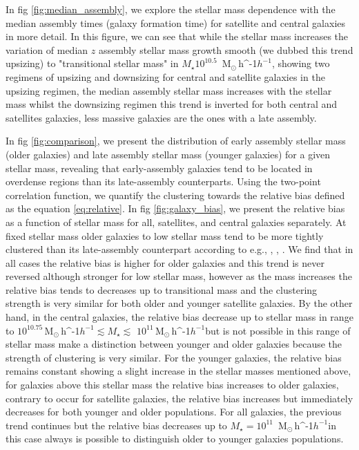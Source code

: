 \documentclass[a4paper,fleqn,usenatbib]{mnras}
\newcommand{\Msunh}{\,{\rm M}$_{\odot}$\,\ifmmode h^{-1}\else $h^{-1}$\fi}
\begin{document}
In fig \ref{fig:median_assembly}, we explore the stellar mass dependence with the median assembly times (galaxy formation time) for satellite and central galaxies in more detail. In this figure, we can see that while the stellar mass increases the variation of median $z$ assembly stellar mass growth smooth (we dubbed this trend upsizing) to "transitional stellar mass" in $M_\star 10^{10.5}$ \Msunh, showing two regimens of upsizing and downsizing for central and satellite galaxies in the upsizing regimen, the median assembly stellar mass increases with the stellar mass whilst the downsizing regimen this trend is inverted for both central and satellites galaxies, less massive galaxies are the ones with a late assembly. %


In fig \ref{fig:comparison}, we present the distribution of early assembly stellar mass (older galaxies) and late assembly stellar mass (younger galaxies) for a given stellar mass, revealing that early-assembly galaxies tend to be located in overdense regions than its late-assembly counterparts. 
Using the two-point correlation function, we quantify the clustering towards the relative bias defined as the equation \ref{eq:relative}. In fig \ref{fig:galaxy_bias}, we present the relative bias as a function of stellar mass for all, satellites, and central galaxies separately. At fixed stellar mass older galaxies to low stellar mass tend to be more tightly clustered than its late-assembly counterpart according to e.g., \citep{Lacerna_2014}, \citep{2013MNRAS.433..515W}, \citep{2009MNRAS.394.2229Z}. We find that in all cases the relative bias is higher for older galaxies and this trend is never reversed although stronger for low stellar mass, however as the mass increases the relative bias tends to decreases up to transitional mass and the clustering strength is very similar for both older and younger satellite galaxies.
By the other hand, in the central galaxies, the relative bias decrease up to stellar mass in range to $10^{10.75}$\Msunh $\lesssim M_\star \lesssim$ $10^{11}$\Msunh but is not possible in this range of stellar mass make a distinction between younger and older galaxies because the strength of clustering is very similar. 
For the younger galaxies, the relative bias remains constant showing a slight increase in the stellar masses mentioned above, for galaxies above this stellar mass the relative bias increases to older galaxies, contrary to occur for satellite galaxies, the relative bias increases but immediately decreases for both younger and older populations. For all galaxies, the previous trend continues but the relative bias decreases up to $M_\star = 10^{11}$ \Msunh in this case always is possible to distinguish older to younger galaxies populations.
\end{document}
